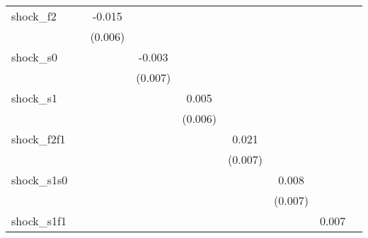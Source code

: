 {\begin{tabular}{l*{8}{c}}
\addlinespace
shock\_f2    &                     &      -0.015\sym{**} &                     &                     &                     &                     &                     &                     \\
            &                     &     (0.006)         &                     &                     &                     &                     &                     &                     \\
\addlinespace
shock\_s0    &                     &                     &      -0.003         &                     &                     &                     &                     &                     \\
            &                     &                     &     (0.007)         &                     &                     &                     &                     &                     \\
\addlinespace
shock\_s1    &                     &                     &                     &       0.005         &                     &                     &                     &                     \\
            &                     &                     &                     &     (0.006)         &                     &                     &                     &                     \\
\addlinespace
shock\_f2f1  &                     &                     &                     &                     &       0.021\sym{***}&                     &                     &                     \\
            &                     &                     &                     &                     &     (0.007)         &                     &                     &                     \\
\addlinespace
shock\_s1s0  &                     &                     &                     &                     &                     &       0.008         &                     &                     \\
            &                     &                     &                     &                     &                     &     (0.007)         &                     &                     \\
\addlinespace
shock\_s1f1  &                     &                     &                     &                     &                     &                     &       0.007         &                     \\

\end{tabular}}
